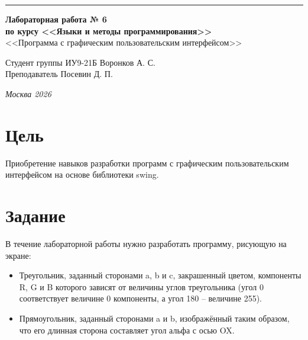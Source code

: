 \documentclass[a4paper, 14pt]{extarticle}
\begin{document}
\begin{titlepage}
\vspace*{-16pt}
\hspace{30pt}\rule{0.866\textwidth}{0.4pt}
  
\vspace{11em}

\begin{center}
\Large {\bf Лабораторная работа № 6} \\ 
\large {\bf по курсу <<Языки и методы программирования>>} \\ 
\large <<Программа с графическим пользовательским 
интерфейсом>>
\end{center}\normalsize

\vspace{8em}


\begin{flushright}
  {Студент группы ИУ9-21Б Воронков А. С.\hspace*{15pt} \\
  \vspace{2ex}
  Преподаватель Посевин Д. П.\hspace*{15pt}}
\end{flushright}

\bigskip

\vfill
 

\begin{center}
\textsl{Москва 2026}
\end{center}
\end{titlepage}

\renewcommand{\ttdefault}{pcr}

\setlength{\tabcolsep}{3pt}
\newpage
\setcounter{page}{2}

\section{Цель}\label{Sect::task}
\par 
Приобретение навыков разработки программ с графическим пользовательским 
интерфейсом на основе библиотеки swing.   
\section{Задание}
В течение лабораторной работы нужно разработать программу, рисующую на экране:
\begin{itemize}
    \item Треугольник, заданный сторонами a, b и c,
    закрашенный цветом, компоненты R, G и B
    которого зависят от величины углов
    треугольника (угол 0 соответствует величине 0
    компоненты, а угол 180 – величине 255).
 
    \item Прямоугольник, заданный сторонами a и b,
    изображённый таким образом, что его длинная
    сторона составляет угол альфа с осью OX.


\end{itemize}
\end{document}
